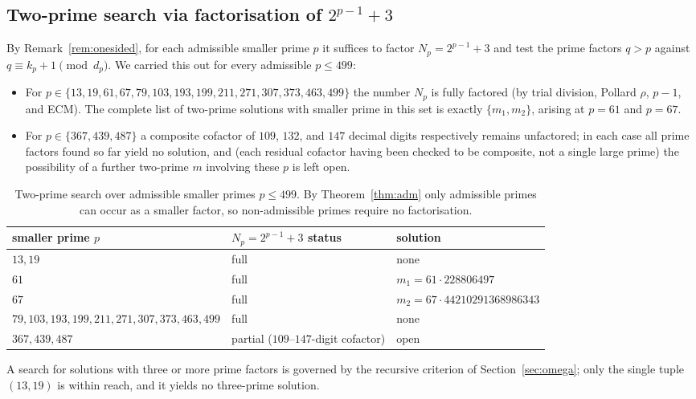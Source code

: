 \documentclass[11pt,reqno]{amsart}
\theoremstyle{plain}
\theoremstyle{definition}
\theoremstyle{remark}
\begin{document}
\subsection{Two-prime search via factorisation of \texorpdfstring{$2^{p-1}+3$}{2^(p-1)+3}}
By Remark~\ref{rem:onesided}, for each admissible smaller prime $p$ it suffices to factor
$N_{p}=2^{p-1}+3$ and test the prime factors $q>p$ against $q\equiv k_{p}+1\pmod{d_{p}}$. We
carried this out for every admissible $p\le 499$:
\begin{itemize}[nosep]
\item For $p\in\{13,19,61,67,79,103,193,199,211,271,307,373,463,499\}$ the number $N_{p}$ is
fully factored (by trial division, Pollard $\rho$, $p-1$, and ECM). The complete list of
two-prime solutions with smaller prime in this set is exactly $\{m_{1},m_{2}\}$, arising at
$p=61$ and $p=67$.
\item For $p\in\{367,439,487\}$ a composite cofactor of $109$, $132$, and $147$ decimal digits
respectively remains unfactored; in each case all prime factors found so far yield no solution,
and (each residual cofactor having been checked to be composite, not a single large prime) the
possibility of a further two-prime $m$ involving these $p$ is left open.
\end{itemize}

\begin{table}[t]
\centering
\small
\begin{tabular}{lll}
\toprule
smaller prime $p$ & $N_{p}=2^{p-1}+3$ status & solution \\
\midrule
$13,19$ & full & none \\
$61$ & full & $m_{1}=61\cdot 228806497$ \\
$67$ & full & $m_{2}=67\cdot 44210291368986343$ \\
$79,103,193,199,211,271,307,373,463,499$ & full & none \\
$367,439,487$ & partial ($109$--$147$-digit cofactor) & open \\
\bottomrule
\end{tabular}
\caption{Two-prime search over admissible smaller primes $p\le 499$. By Theorem~\ref{thm:adm}
only admissible primes can occur as a smaller factor, so non-admissible primes require no
factorisation.}
\label{tab:search}
\end{table}

A search for solutions with three or more prime factors is governed by the recursive criterion
of Section~\ref{sec:omega}; only the single tuple $(13,19)$ is within reach, and it yields no
three-prime solution.
\end{document}
